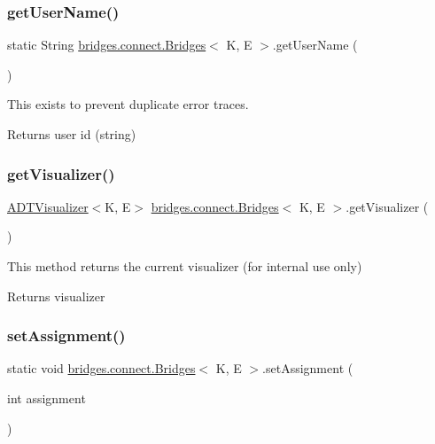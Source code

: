 \subsubsection{\texorpdfstring{get\+User\+Name()}{getUserName()}}
{\footnotesize\ttfamily static String \hyperlink{classbridges_1_1connect_1_1_bridges}{bridges.\+connect.\+Bridges}$<$ K, E $>$.get\+User\+Name (\begin{DoxyParamCaption}{ }\end{DoxyParamCaption})\hspace{0.3cm}{\ttfamily [static]}}

This exists to prevent duplicate error traces.

\begin{DoxyReturn}{Returns}
user id (string) 
\end{DoxyReturn}
\hypertarget{classbridges_1_1connect_1_1_bridges_a7193b48c9dc01b04dfcf0d66fa2f59fb}{}\label{classbridges_1_1connect_1_1_bridges_a7193b48c9dc01b04dfcf0d66fa2f59fb} 
\subsubsection{\texorpdfstring{get\+Visualizer()}{getVisualizer()}}
{\footnotesize\ttfamily \hyperlink{classbridges_1_1base_1_1_a_d_t_visualizer}{A\+D\+T\+Visualizer}$<$K, E$>$ \hyperlink{classbridges_1_1connect_1_1_bridges}{bridges.\+connect.\+Bridges}$<$ K, E $>$.get\+Visualizer (\begin{DoxyParamCaption}{ }\end{DoxyParamCaption})}

This method returns the current visualizer (for internal use only)

\begin{DoxyReturn}{Returns}
visualizer 
\end{DoxyReturn}
\hypertarget{classbridges_1_1connect_1_1_bridges_a24c91901a59ab8b715a864ab8a4d9cdc}{}\label{classbridges_1_1connect_1_1_bridges_a24c91901a59ab8b715a864ab8a4d9cdc} 
\subsubsection{\texorpdfstring{set\+Assignment()}{setAssignment()}}
{\footnotesize\ttfamily static void \hyperlink{classbridges_1_1connect_1_1_bridges}{bridges.\+connect.\+Bridges}$<$ K, E $>$.set\+Assignment (\begin{DoxyParamCaption}\item[{int}]{assignment }\end{DoxyParamCaption})\hspace{0.3cm}{\ttfamily [static]}}

